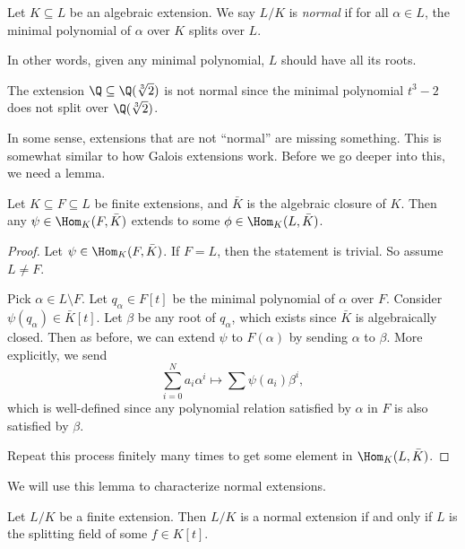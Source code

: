 \documentclass[a4paper]{article}
\begin{document}
\begin{defi}
  Let $K \subseteq L$ be an algebraic extension. We say $L/K$ is \emph{normal} if for all $\alpha \in L$, the minimal polynomial of $\alpha$ over $K$ splits over $L$.
\end{defi}
In other words, given any minimal polynomial, $L$ should have all its roots.

\begin{eg}
  The extension $\Q\subseteq \Q(\sqrt[3]{2})$ is not normal since the minimal polynomial $t^3 - 2$ does not split over $\Q(\sqrt[3]{2})$.
\end{eg}
In some sense, extensions that are not ``normal'' are missing something. This is somewhat similar to how Galois extensions work. Before we go deeper into this, we need a lemma.

\begin{lemma}
  Let $K\subseteq F \subseteq L$ be finite extensions, and $\bar K$ is the algebraic closure of $K$. Then any $\psi \in \Hom_K(F, \bar K)$ extends to some $\phi \in \Hom_K(L, \bar K)$.
\end{lemma}

\begin{proof}
  Let $\psi \in \Hom_K(F, \bar K)$. If $F = L$, then the statement is trivial. So assume $L \not= F$.

  Pick $\alpha \in L\setminus F$. Let $q_\alpha \in F[t]$ be the minimal polynomial of $\alpha$ over $F$. Consider $\psi(q_\alpha) \in \bar{K} [t]$. Let $\beta$ be any root of $q_\alpha$, which exists since $\bar{K}$ is algebraically closed. Then as before, we can extend $\psi$ to $F(\alpha)$ by sending $\alpha$ to $\beta$. More explicitly, we send
  \[
    \sum_{i = 0}^N a_i \alpha^i \mapsto \sum \psi(a_i) \beta^i,
  \]
  which is well-defined since any polynomial relation satisfied by $\alpha$ in $F$ is also satisfied by $\beta$.

  Repeat this process finitely many times to get some element in $\Hom_K(L, \bar{K})$.
\end{proof}
We will use this lemma to characterize normal extensions.

\begin{thm}
  Let $L/K$ be a finite extension. Then $L/K$ is a normal extension if and only if $L$ is the splitting field of some $f \in K[t]$.
\end{thm}
\end{document}
